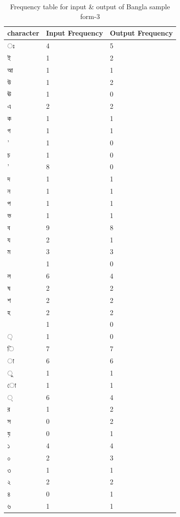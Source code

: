 \begin{table}[H]
\centering
\begin{tabular}{|p{2cm}|p{2cm}|p{2cm}|}
\hline
character & Input Frequency & Output Frequency \\
\hline
{\bengalifont ঃ} & 4 & 5\\
\hline
{\bengalifont ই} & 1 & 2\\
\hline
{\bengalifont আ} & 1 & 1\\
\hline
{\bengalifont উ} & 1 & 2\\
\hline
{\bengalifont ঊ} & 1 & 0\\
\hline
{\bengalifont এ} & 2 & 2\\
\hline
{\bengalifont ক} & 1 & 1\\
\hline
{\bengalifont গ} & 1 & 1\\
\hline
{\bengalifont ’} & 1 & 0\\
\hline
{\bengalifont চ} & 1 & 0\\
\hline
{\bengalifont '} & 8 & 0\\
\hline
{\bengalifont দ} & 1 & 1\\
\hline
{\bengalifont ন} & 1 & 1\\
\hline
{\bengalifont প} & 1 & 1\\
\hline
{\bengalifont ভ} & 1 & 1\\
\hline
{\bengalifont ব} & 9 & 8\\
\hline
{\bengalifont য} & 2 & 1\\
\hline
{\bengalifont ম} & 3 & 3\\
\hline
{\bengalifont 0} & 1 & 0\\
\hline
{\bengalifont ল} & 6 & 4\\
\hline
{\bengalifont ষ} & 2 & 2\\
\hline
{\bengalifont শ} & 2 & 2\\
\hline
{\bengalifont হ} & 2 & 2\\
\hline
{\bengalifont 8} & 1 & 0\\
\hline
{\bengalifont ়} & 1 & 0\\
\hline
{\bengalifont ি} & 7 & 7\\
\hline
{\bengalifont া} & 6 & 6\\
\hline
{\bengalifont ু} & 1 & 1\\
\hline
{\bengalifont ো} & 1 & 1\\
\hline
{\bengalifont ্} & 6 & 4\\
\hline
{\bengalifont র} & 1 & 2\\
\hline
{\bengalifont স} & 0 & 2\\
\hline
{\bengalifont য়} & 0 & 1\\
\hline
{\bengalifont ১} & 4 & 4\\
\hline
{\bengalifont ০} & 2 & 3\\
\hline
{\bengalifont ৩} & 1 & 1\\
\hline
{\bengalifont ২} & 2 & 2\\
\hline
{\bengalifont ৪} & 0 & 1\\
\hline
{\bengalifont ৬} & 1 & 1\\
\hline
\end{tabular}
\caption {Frequency table for input \& output of Bangla sample form-3}
\label {tab:BTable3}
\end{table}

